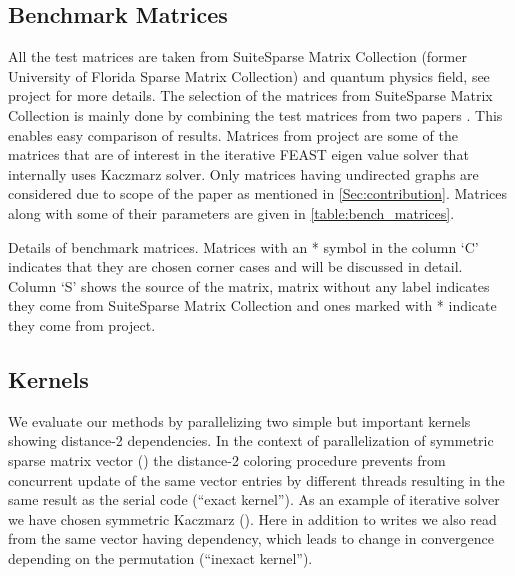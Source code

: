 \subsection{Benchmark Matrices}
All the test matrices are taken from SuiteSparse Matrix Collection (former University of Florida Sparse Matrix Collection) \cite{UOF} and quantum physics field, see \ESSEX project \cite{ESSEX} for more details. The selection of the matrices from SuiteSparse Matrix Collection is  mainly done by combining the test matrices from two papers \cite{RSB,park_ls}. This enables easy comparison of results. Matrices from \ESSEX project are some of the matrices that are of interest in the iterative FEAST eigen value solver that internally uses Kaczmarz solver. Only matrices having undirected graphs are considered due to scope of the paper as mentioned in \cref{Sec:contribution}. Matrices along with some of their parameters are given in \cref{table:bench_matrices}. 
\begin{table}[ht]
	\footnotesize
	\caption{Details of benchmark matrices. Matrices with an * symbol in the column `C' indicates that they are chosen corner cases and will be discussed in detail. Column `S' shows the source of the matrix, matrix without any label indicates they come from SuiteSparse Matrix Collection and ones marked with * indicate they come from \ESSEX project.} \label{tab:test_mtx}
	\label{table:bench_matrices}
	\begin{center}
		
	\end{center}
\end{table}

\subsection{Kernels} \label{subsec:test_kernels}
We evaluate our methods by parallelizing two simple but important kernels showing distance-2 dependencies. In the context of parallelization of symmetric sparse matrix vector (\SymmSpmv) the distance-2 coloring procedure prevents from concurrent update of the same vector entries by different threads resulting in the same result as the serial code (``exact kernel''). As an example of iterative solver we have chosen symmetric Kaczmarz (\SYMMKACZ). Here in addition to writes we also read from the same vector having dependency, which leads to change in convergence depending on the permutation (``inexact kernel'').

